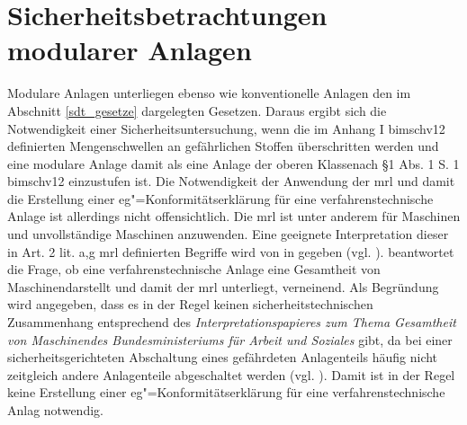 \section{Sicherheitsbetrachtungen modularer Anlagen}
Modulare Anlagen unterliegen ebenso wie konventionelle Anlagen den im Abschnitt \ref{sdt_gesetze} dargelegten Gesetzen. Daraus ergibt sich die Notwendigkeit einer Sicherheitsuntersuchung, wenn die im {Anhang I \ac{bimschv12}} definierten Mengenschwellen an gef\"ahrlichen Stoffen \"uberschritten werden und eine modulare Anlage damit als eine Anlage \glqq der oberen Klasse\grqq { }nach {\S 1 Abs. 1 S. 1 \ac{bimschv12}} einzustufen ist. \newline
Die Notwendigkeit der Anwendung der \ac{mrl} und damit die Erstellung einer \ac{eg}"=Konformit\"atserkl\"arung f\"ur eine verfahrenstechnische Anlage ist allerdings nicht offensichtlich. Die \ac{mrl} ist unter anderem f\"ur \glqq Maschinen und \glqq unvollst\"andige Maschinen anzuwenden. Eine geeignete Interpretation dieser in Art. 2 lit. a,g \ac{mrl} definierten Begriffe wird von \citeauthor{Weber_2016} in  gegeben {(vgl. \cite[S. 589 ff.]{Weber_2016})}. \newline
\citeauthor{Weber_2016} beantwortet die Frage, ob eine verfahrenstechnische Anlage eine \glqq Gesamtheit von Maschinen\grqq { }darstellt und damit der \ac{mrl} unterliegt, verneinend. Als Begr\"undung wird angegeben, dass es in der Regel keinen sicherheitstechnischen Zusammenhang entsprechend des \textit{Interpretationspapieres zum Thema \glqq Gesamtheit von Maschinen\grqq { }des Bundesministeriums f\"ur Arbeit und Soziales} gibt, da bei einer sicherheitsgerichteten Abschaltung eines gef\"ahrdeten Anlagenteils h\"aufig nicht zeitgleich andere Anlagenteile abgeschaltet werden {(vgl. \cite[S. 591]{Weber_2016})}. Damit ist in der Regel keine Erstellung einer \ac{eg}"=Konformit\"atserkl\"arung f\"ur eine verfahrenstechnische Anlag notwendig. \newline
